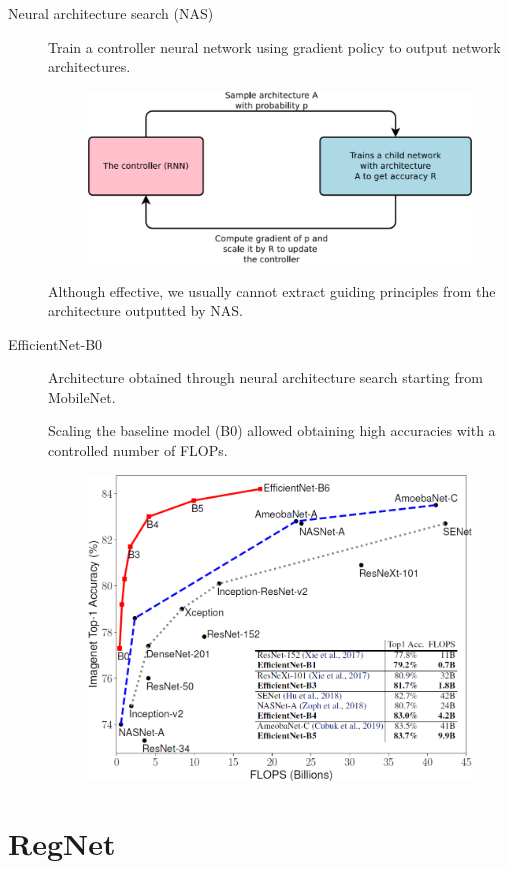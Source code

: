 \begin{description}
    \item[Neural architecture search (NAS)] 
        Train a controller neural network using gradient policy to output network architectures.

        \begin{figure}[H]
            \centering
            \includegraphics[width=0.45\linewidth]{./img/neural_architecture_search.png}
        \end{figure}

        \begin{remark}
            Although effective, we usually cannot extract guiding principles from the architecture outputted by NAS.
        \end{remark}

    \item[EfficientNet-B0] 
        Architecture obtained through neural architecture search starting from MobileNet.

        Scaling the baseline model (B0) allowed obtaining high accuracies with a controlled number of FLOPs.
        \begin{figure}[H]
            \centering
            \includegraphics[width=0.45\linewidth]{./img/efficientnet_scaling.png}
        \end{figure}
\end{description}



\section{RegNet}

